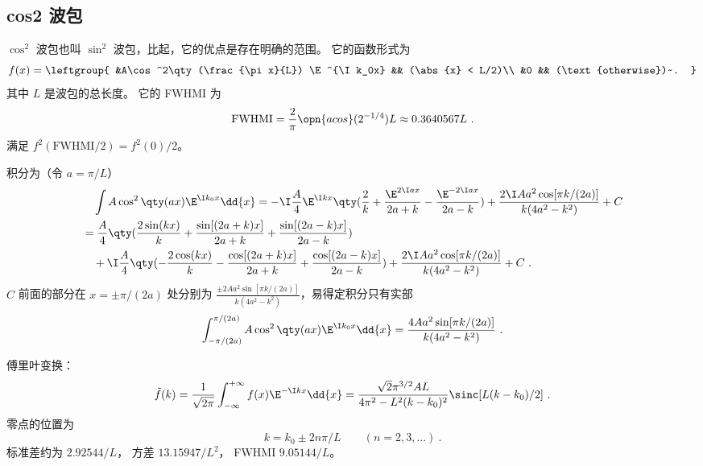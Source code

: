 
\subsection{cos2 波包}
$\cos^2$ 波包也叫 $\sin^2$ 波包，比起，它的优点是存在明确的范围。 它的函数形式为
\begin{equation}\label{eq_cos2wp_5}
f(x) = \leftgroup{
&A\cos^2\qty(\frac{\pi x}{L}) \E^{\I k_0x} && (\abs{x} < L/2)\\
&0 && (\text{otherwise})~.
}\end{equation}
其中 $L$ 是波包的总长度。 它的 FWHMI 为
\begin{equation}\label{eq_cos2wp_4} %
\text{FWHMI} = \frac{2}{\pi}\opn{acos}(2^{-1/4}) L \approx 0.3640567 L~.
\end{equation}
满足 $f^2(\text{FWHMI/2}) = f^2(0)/2$。

积分为（令 $a = \pi/L$）
\begin{equation}\label{eq_cos2wp_2} %
\begin{aligned}
&\quad \int A\cos^2\qty(a x) \E^{\I k_0x} \dd{x} = -\I\frac{A}{4}\E^{\I kx}\qty(\frac{2}{k} +\frac{\E^{2\I ax}}{2a+k} -\frac{\E^{-2\I ax}}{2a-k}) + \frac{2\I Aa^2\cos[{\pi k}/{(2a)}]}{k(4 a^2 -k^2)} + C\\
&= \frac{A}{4} \qty(\frac{2\sin(k x)}{k} +\frac{\sin[(2 a+k)x]}{2 a+k} +\frac{\sin[(2 a-k)x]}{2 a-k})\\
&\quad + \I\frac{A}{4} \qty(-\frac{2\cos(k x)}{k} -\frac{\cos[(2 a+k)x]}{2 a+k} +\frac{\cos[(2 a-k)x]}{2 a-k}) + \frac{2\I Aa^2\cos[{\pi k}/{(2a)}]}{k(4 a^2 -k^2)} + C~.
\end{aligned}
\end{equation}
$C$ 前面的部分在 $x = \pm\pi/(2a)$ 处分别为 $\frac{\pm 2 Aa^2\sin[{\pi k}/{(2a)}]}{k(4 a^2 -k^2)}$，易得定积分只有实部
\begin{equation}%
\int_{-\pi/(2a)}^{\pi/(2a)} A\cos^2\qty(a x)\E^{\I k_0x} \dd{x} = \frac{4 Aa^2\sin[{\pi k}/{(2a)}]}{k(4 a^2 -k^2)}~.
\end{equation}

傅里叶变换：
\begin{equation} %
\tilde f(k) = \frac{1}{\sqrt{2\pi}} \int_{-\infty}^{+\infty} f(x) \E^{-\I k x} \dd{x}
= \frac{\sqrt{2} \pi ^{3/2} A L}{4 \pi ^2-L^2 (k-k_0)^2} \sinc[L(k-k_0)/2]~.
\end{equation}
零点的位置为
\begin{equation} %
k = k_0 \pm 2n\pi/L \qquad (n=2,3,\dots)~.
\end{equation}
标准差约为 $2.92544/L$， 方差 $13.15947/L^2$， FWHMI $9.05144/L$。

